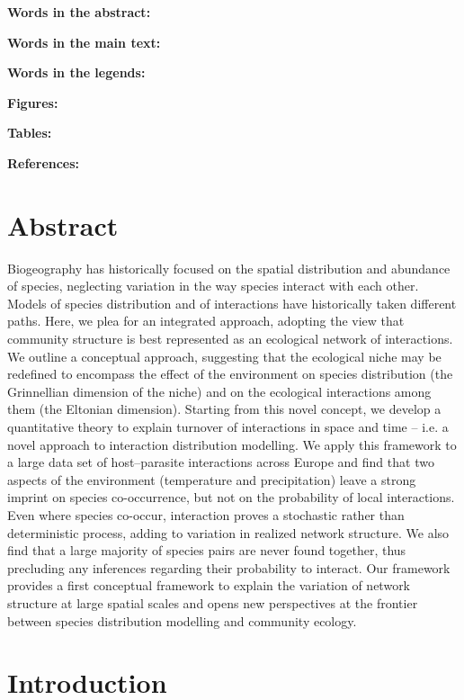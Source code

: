 \documentclass[12pt]{article}
\begin{document}
\textbf{Words in the abstract:} 

\textbf{Words in the main text:} 

\textbf{Words in the legends:}  

\textbf{Figures:} 

\textbf{Tables:}     

\textbf{References:} 

\newpage
\doublespacing

\section*{Abstract} 

Biogeography has historically focused on the spatial distribution and
abundance of species, neglecting variation in the way species interact with
each other. Models of species distribution and of interactions have
historically taken different paths. Here, we plea for an integrated approach,
adopting the view that community structure is best represented as an
ecological network of interactions. We outline a conceptual approach,
suggesting that the ecological niche may be redefined to encompass the effect
of the environment on species distribution (the Grinnellian dimension of the
niche) and on the ecological interactions among them (the Eltonian dimension).
Starting from this novel concept, we develop a quantitative theory to explain
turnover of interactions in space and time – i.e. a novel approach to
interaction distribution modelling. We apply this framework to a large
data set of host–parasite interactions across Europe and find that two aspects
of the environment (temperature and precipitation) leave a strong imprint on
species co-occurrence, but not on the probability of local interactions. Even
where species co-occur, interaction proves a stochastic rather than
deterministic process, adding to variation in realized network structure. We
also find that a large majority of species pairs are never found together,
thus precluding any inferences regarding their probability to interact. Our
framework provides a first conceptual framework to explain the variation of
network structure at large spatial scales and opens new perspectives at the
frontier between species distribution modelling and community ecology.

\newpage

\section*{Introduction}
\end{document}
